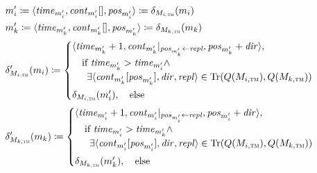 \begin{align*}
    &
    \model{m}{i}' \equalsperdefinition \tupled{\mathvariable{time}_{\model{m}{i}'}, \sequence{\mathvariable{cont}_{\model{m}{i}'}}, \mathvariable{pos}_{\model{m}{i}'}} \equalsperdefinition \changetuple{\metamodel{M}{i,\TuringMachine}}(\model{m}{i}) \\
    &
    \model{m}{k}' \equalsperdefinition \tupled{\mathvariable{time}_{\model{m}{k}'}, \sequence{\mathvariable{cont}_{\model{m}{k}'}}, \mathvariable{pos}_{\model{m}{k}'}} \equalsperdefinition \changetuple{\metamodel{M}{k,\TuringMachine}}(\model{m}{k}) \\
    &
    \change{\metamodel{M}{i,\TuringMachine}}'(\model{m}{i}) \equalsperdefinition 
    \begin{cases}
        \tupled{\mathvariable{time}_{\model{m}{k}'} + 1, \mathvariable{cont}_{\model{m}{k}'}|_{\mathvariable{pos}_{\model{m}{k}'} \gets \mathvariable{repl}}, \mathvariable{pos}_{\model{m}{k}'} + \mathvariable{dir}}, \\
        \formulaskip 
            \text{if } \mathvariable{time}_{\model{m}{k}'} > \mathvariable{time}_{\model{m}{i}'} \land \\
        \formulaskip\formulaskip[0.5em]
            \exists \tupled{\sequenceindex{\mathvariable{cont}_{\model{m}{k}'}}{\mathvariable{pos}_{\model{m}{k}'}}, \mathvariable{dir},\mathvariable{repl}} \in \Tr(Q(\metamodel{M}{i,\TuringMachine}),Q(\metamodel{M}{k,\TuringMachine}))\\[.4em]
        \change{\metamodel{M}{i,\TuringMachine}}(\model{m}{i}'), \formulaskip 
        \text{else}
    \end{cases} \\
    &
    \change{\metamodel{M}{k,\TuringMachine}}'(\model{m}{k}) \equalsperdefinition 
    \begin{cases}
        \tupled{\mathvariable{time}_{\model{m}{i}'} + 1, \mathvariable{cont}_{\model{m}{i}'}|_{\mathvariable{pos}_{\model{m}{i}'} \gets \mathvariable{repl}}, \mathvariable{pos}_{\model{m}{i}'} + \mathvariable{dir}}, \\
        \formulaskip 
            \text{if } \mathvariable{time}_{\model{m}{i}'} > \mathvariable{time}_{\model{m}{k}'} \land \\
        \formulaskip\formulaskip[0.5em]
            \exists \tupled{\sequenceindex{\mathvariable{cont}_{\model{m}{i}'}}{\mathvariable{pos}_{\model{m}{i}'}}, \mathvariable{dir},\mathvariable{repl}} \in \Tr(Q(\metamodel{M}{i,\TuringMachine}),Q(\metamodel{M}{k,\TuringMachine}))\\[.4em]
        \change{\metamodel{M}{k,\TuringMachine}}(\model{m}{k}'), \formulaskip 
        \text{else}
    \end{cases}
\end{align*}

